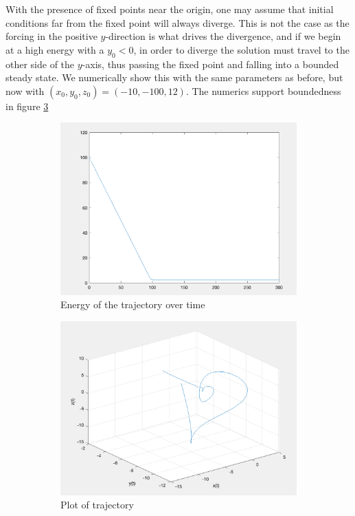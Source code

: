 \documentclass[11pt]{article}
\begin{document}
With the presence of fixed points near the origin, one may assume that initial conditions far from the fixed point will always diverge. This is not the case as the forcing in the positive $y$-direction is what drives the divergence, and if we begin at a high energy with a $y_0 < 0$, in order to diverge the solution must travel to the other side of the $y$-axis, thus passing the fixed point and falling into a bounded steady state. We numerically show this with the same parameters as before, but now with $(x_0, y_0, z_0) = (-10, -100, 12)$. The numerics support boundedness in figure \ref{fig:new2}

\begin{figure}[h!]
\centering
\begin{subfigure}{.5\textwidth}
  \centering
  \includegraphics[width=0.9\linewidth]{new2e.png}
  \caption{Energy of the trajectory over time}
  \label{}
\end{subfigure}%
\begin{subfigure}{.5\textwidth}
  \centering
  \includegraphics[width=0.9\linewidth]{new2p.png}
  \caption{Plot of trajectory}
  \label{}
\end{subfigure}
\caption{}
\label{fig:new2}
\end{figure}
\end{document}

